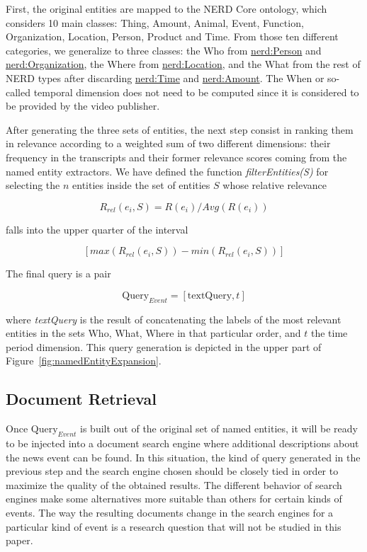 \documentclass{llncs}
\begin{document}
First, the original entities are mapped to the NERD Core ontology, which considers 10 main classes: Thing, Amount, Animal, Event, Function, Organization, Location, Person, Product and Time. From those ten different categories, we generalize to three classes: the Who from \url{nerd:Person} and \url{nerd:Organization}, the Where from \url{nerd:Location}, and the What from the rest of NERD types after discarding \url{nerd:Time} and \url{nerd:Amount}. The When or so-called temporal dimension does not need to be computed since it is considered to be provided by the video publisher.

After generating the three sets of entities, the next step consist in ranking them in relevance according to a weighted sum of two different dimensions: their frequency in the transcripts and their former relevance scores coming from the named entity extractors. We have defined the function \emph{filterEntities(S)} for selecting the $n$ entities inside the set of entities $S$ whose relative relevance

\begin{equation}
R_{rel}\left ( e_{i}, S \right ) = R\left ( e_{i} \right ) / Avg \left ( R\left ( e_{i} \right )  \right )
\end{equation}

falls into the upper quarter of the interval

\begin{equation}
\left [ max\left ( R_{rel}\left ( e_{i}, S \right )  \right ) -min\left (  R_{rel}\left ( e_{i}, S \right ) \right ) \right ]
\end{equation}

The final query is a pair

\begin{equation}
\text{Query}_{Event} =\left [ \text{textQuery}, t \right ]
\end{equation}

where \textit{textQuery} is the result of concatenating the labels of the most relevant entities in the sets Who, What, Where in that particular order, and $t$ the time period dimension. This query generation is depicted in the upper part of Figure~\ref{fig:namedEntityExpansion}.

\subsection{Document Retrieval}
Once $\text{Query}_{Event}$ is built out of the original set of named entities, it will be ready to be injected into a document search engine where additional descriptions about the news event can be found. In this situation, the kind of query generated in the previous step and the search engine chosen should be closely tied in order to maximize the quality of the obtained results. The different behavior of search engines make some alternatives more suitable than others for certain kinds of events. The way the resulting documents change in the search engines for a particular kind of event is a research question that will not be studied in this paper.
\end{document}
